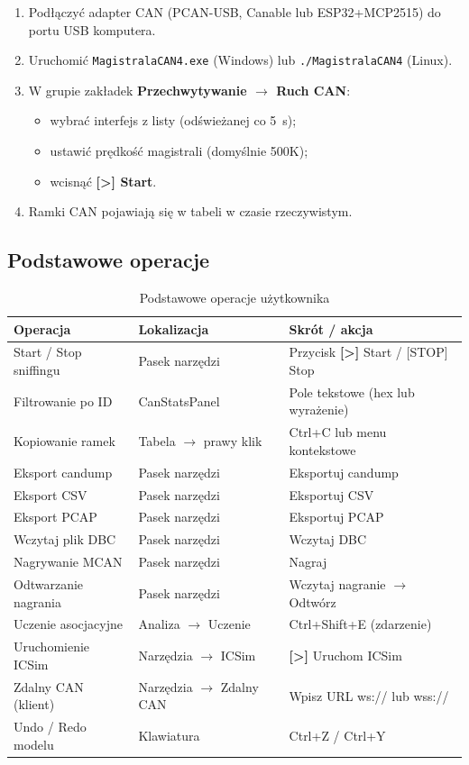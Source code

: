 \documentclass[12pt, a4paper]{article}
\begin{document}
\begin{enumerate}
  \item Podłączyć adapter CAN (PCAN-USB, Canable lub ESP32+MCP2515)
        do portu USB komputera.
  \item Uruchomić \texttt{MagistralaCAN4.exe} (Windows) lub
        \texttt{./MagistralaCAN4} (Linux).
  \item W grupie zakładek \textbf{Przechwytywanie $\to$ Ruch CAN}:
    \begin{itemize}
      \item wybrać interfejs z listy (odświeżanej co 5~s);
      \item ustawić prędkość magistrali (domyślnie 500K);
      \item wcisnąć \textbf{\textbf{[>]} Start}.
    \end{itemize}
  \item Ramki CAN pojawiają się w tabeli w czasie rzeczywistym.
\end{enumerate}

\subsection{Podstawowe operacje}

\begin{table}[H]
\caption{Podstawowe operacje użytkownika}
\label{tab:ops}
\centering
\small
\begin{tabular}{lll}
\toprule
\textbf{Operacja} & \textbf{Lokalizacja} & \textbf{Skrót / akcja} \\
\midrule
Start / Stop sniffingu        & Pasek narzędzi         & Przycisk \textbf{[>]} Start / [STOP] Stop \\
Filtrowanie po ID             & CanStatsPanel          & Pole tekstowe (hex lub wyrażenie) \\
Kopiowanie ramek              & Tabela $\to$ prawy klik    & Ctrl+C lub menu kontekstowe \\
Eksport candump               & Pasek narzędzi         & Eksportuj candump \\
Eksport CSV                   & Pasek narzędzi         & Eksportuj CSV \\
Eksport PCAP                  & Pasek narzędzi         & Eksportuj PCAP \\
Wczytaj plik DBC              & Pasek narzędzi         & Wczytaj DBC \\
Nagrywanie MCAN               & Pasek narzędzi         & Nagraj \\
Odtwarzanie nagrania          & Pasek narzędzi         & Wczytaj nagranie $\rightarrow$ Odtwórz \\
Uczenie asocjacyjne           & Analiza $\to$ Uczenie      & Ctrl+Shift+E (zdarzenie) \\
Uruchomienie ICSim            & Narzędzia $\to$ ICSim      & \textbf{[>]} Uruchom ICSim \\
Zdalny CAN (klient)           & Narzędzia $\to$ Zdalny CAN & Wpisz URL ws:// lub wss:// \\
Undo / Redo modelu            & Klawiatura             & Ctrl+Z / Ctrl+Y \\
\bottomrule
\end{tabular}
\end{table}
\end{document}
